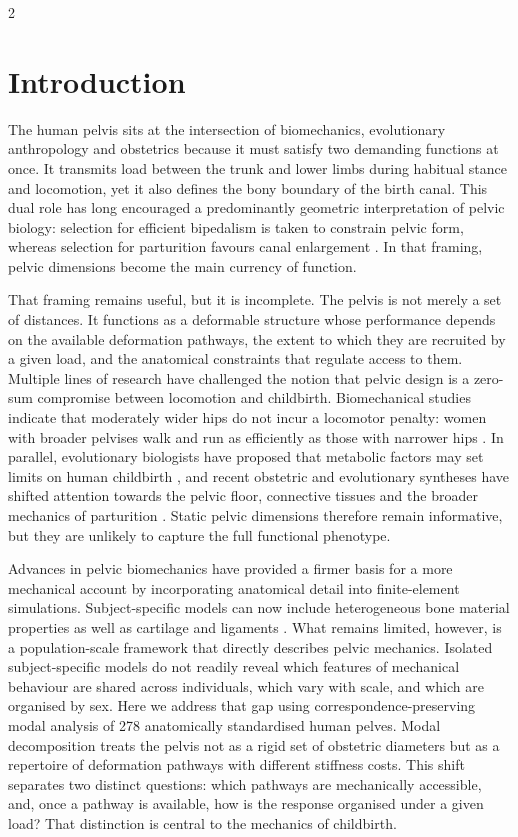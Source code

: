 \documentclass[openacc]{rsproca_new}
\begin{document}
\begin{multicols}{2}

\section{Introduction}

The human pelvis sits at the intersection of biomechanics, evolutionary anthropology and obstetrics because it must satisfy two demanding functions at once. It transmits load between the trunk and lower limbs during habitual stance and locomotion, yet it also defines the bony boundary of the birth canal. This dual role has long encouraged a predominantly geometric interpretation of pelvic biology: selection for efficient bipedalism is taken to constrain pelvic form, whereas selection for parturition favours canal enlargement \cite{RosenbergTrevathan2002,Trevathan2015,Grunstra2023}. In that framing, pelvic dimensions become the main currency of function.

That framing remains useful, but it is incomplete. The pelvis is not merely a set of distances. It functions as a deformable structure whose performance depends on the available deformation pathways, the extent to which they are recruited by a given load, and the anatomical constraints that regulate access to them. Multiple lines of research have challenged the notion that pelvic design is a zero-sum compromise between locomotion and childbirth. Biomechanical studies indicate that moderately wider hips do not incur a locomotor penalty: women with broader pelvises walk and run as efficiently as those with narrower hips \cite{Warrener2015}. In parallel, evolutionary biologists have proposed that metabolic factors may set limits on human childbirth \cite{Dunsworth2012}, and recent obstetric and evolutionary syntheses have shifted attention towards the pelvic floor, connective tissues and the broader mechanics of parturition \cite{Pavlicev2020,Haeusler2021,Grunstra2023}. Static pelvic dimensions therefore remain informative, but they are unlikely to capture the full functional phenotype.

Advances in pelvic biomechanics have provided a firmer basis for a more mechanical account by incorporating anatomical detail into finite-element simulations. Subject-specific models can now include heterogeneous bone material properties as well as cartilage and ligaments \cite{Eichenseer2011,Hammer2013}. What remains limited, however, is a population-scale framework that directly describes pelvic mechanics. Isolated subject-specific models do not readily reveal which features of mechanical behaviour are shared across individuals, which vary with scale, and which are organised by sex. Here we address that gap using correspondence-preserving modal analysis of 278 anatomically standardised human pelves. Modal decomposition treats the pelvis not as a rigid set of obstetric diameters but as a repertoire of deformation pathways with different stiffness costs. This shift separates two distinct questions: which pathways are mechanically accessible, and, once a pathway is available, how is the response organised under a given load? That distinction is central to the mechanics of childbirth.


\end{multicols}
\end{document}
